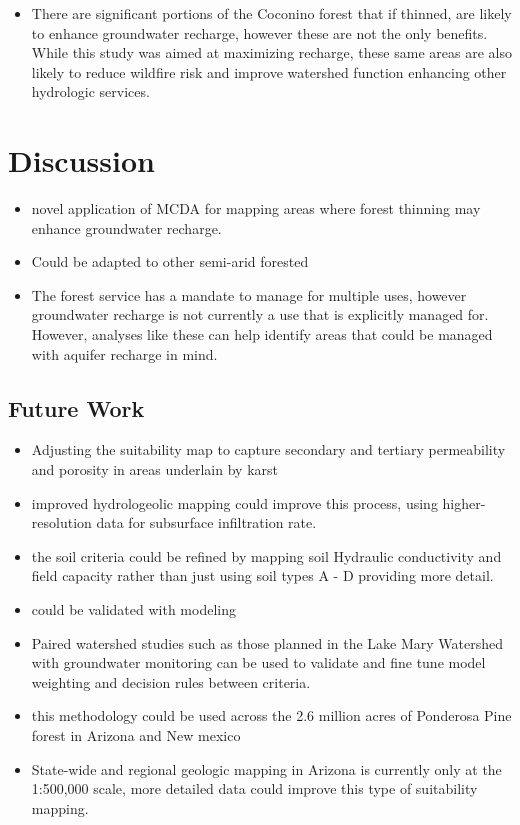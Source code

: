 \documentclass[
]{agujournal2019}
\providecommand{\tightlist}{%
  \setlength{\itemsep}{0pt}\setlength{\parskip}{0pt}}\usepackage{longtable,booktabs,array}
\begin{document}
\begin{itemize}
\tightlist
\item
  There are significant portions of the Coconino forest that if thinned,
  are likely to enhance groundwater recharge, however these are not the
  only benefits. While this study was aimed at maximizing recharge,
  these same areas are also likely to reduce wildfire risk and improve
  watershed function enhancing other hydrologic services.
\end{itemize}

\section{Discussion}\label{discussion}

\begin{itemize}
\item
  novel application of MCDA for mapping areas where forest thinning may
  enhance groundwater recharge.
\item
  Could be adapted to other semi-arid forested
\item
  The forest service has a mandate to manage for multiple uses, however
  groundwater recharge is not currently a use that is explicitly managed
  for. However, analyses like these can help identify areas that could
  be managed with aquifer recharge in mind.
\end{itemize}

\subsection{Future Work}\label{future-work}

\begin{itemize}
\item
  Adjusting the suitability map to capture secondary and tertiary
  permeability and porosity in areas underlain by karst
\item
  improved hydrologeolic mapping could improve this process, using
  higher-resolution data for subsurface infiltration rate.
\item
  the soil criteria could be refined by mapping soil Hydraulic
  conductivity and field capacity rather than just using soil types A -
  D providing more detail.
\item
  could be validated with modeling
\item
  Paired watershed studies such as those planned in the Lake Mary
  Watershed with groundwater monitoring can be used to validate and fine
  tune model weighting and decision rules between criteria.
\item
  this methodology could be used across the 2.6 million acres of
  Ponderosa Pine forest in Arizona and New mexico
\item
  State-wide and regional geologic mapping in Arizona is currently only
  at the 1:500,000 scale, more detailed data could improve this type of
  suitability mapping.
\end{itemize}
\end{document}

